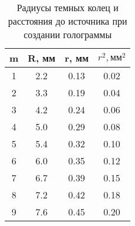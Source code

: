 \begin{table}
\begin{tabular}{| c | c | c | c |}
\hline
m & R, мм & r, мм & $r^2, \text{мм}^2$\\
\hline
1 & 2.2 & 0.13 & 0.02 \\
\hline
2 & 3.3 & 0.19 & 0.04 \\
\hline
3 & 4.2 & 0.24 & 0.06 \\
\hline
4 & 5.0 & 0.29 & 0.08 \\
\hline
5 & 5.4 & 0.32 & 0.10 \\
\hline
6 & 6.0 & 0.35 & 0.12 \\
\hline
7 & 6.7 & 0.39 & 0.15 \\
\hline
8 & 7.2 & 0.42 & 0.18 \\
\hline
9 & 7.6 & 0.45 & 0.20 \\
\hline
\end{tabular}
\caption{Радиусы темных колец и расстояния до источника при создании голограммы}
\end{table}